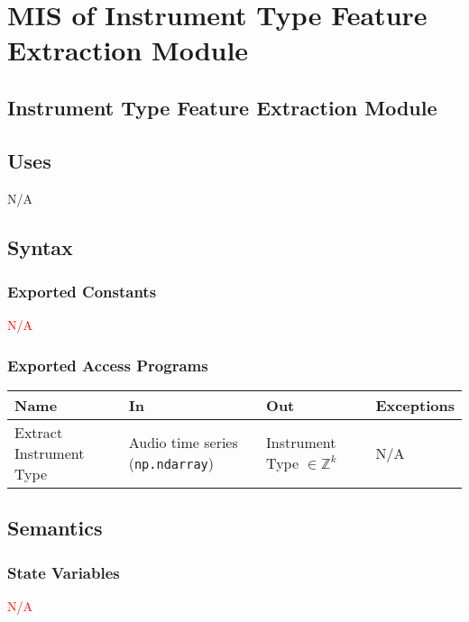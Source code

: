 \documentclass[12pt, titlepage]{article}
\begin{document}
\section{MIS of Instrument Type Feature Extraction Module} 

\subsection{Instrument Type Feature Extraction Module}

\subsection{Uses}
N/A

\subsection{Syntax}

\subsubsection{Exported Constants}
\textcolor{red}{N/A}

\subsubsection{Exported Access Programs}

\begin{center}
\begin{tabular}{p{2cm} p{4cm} p{4cm} p{2cm}}
\hline
\textbf{Name} & \textbf{In} & \textbf{Out} & \textbf{Exceptions}\\
\hline%
Extract Instrument Type &Audio time series (\texttt{np.ndarray}) & Instrument Type $\in \mathbb{Z}^k$ & N/A \\
\hline
\end{tabular}
\end{center}

\subsection{Semantics}

\subsubsection{State Variables}
\textcolor{red}{N/A}
\end{document}
